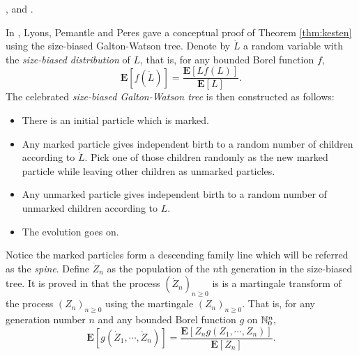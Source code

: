 \documentclass[12pt]{amsart}
\theoremstyle{remark}
\numberwithin{equation}{section}
\newcommand{\defn}[1]{{\em #1}}
\newcommand{\expr}[1]{\left( #1 \right)}
\newcommand{\brac}[1]{\left[ #1 \right]}
\newcommand{\expct}{\mathbf E}
\begin{document}
\cite{lyons1995conceptual}, \cite{geiger1999elementary} and \cite{geiger2000new}.
\par
In \cite{lyons1995conceptual}, Lyons, Pemantle and Peres
gave
a conceptual proof of Theorem \ref{thm:kesten} using the size-biased Galton-Watson tree. Denote by $\dot L$ a random variable with 
the \defn{size-biased distribution} of $L$, 
that is, for any bounded Borel function $f$,
\begin{equation*}
		\expct\brac{f\expr{\dot L}}
	=
		\frac{\expct\brac{Lf(L)}}{\expct\brac{L}}.
\end{equation*}
	The celebrated \defn{size-biased Galton-Watson tree} is then constructed as follows:
\begin{itemize}
\item
	There is an initial particle which is marked.
\item
	Any marked particle gives independent birth to a random number of children according to $\dot L$. Pick one of those children randomly as 
the new marked particle while leaving other children as unmarked particles.
\item
	Any unmarked particle gives independent birth to a random number of unmarked children according to $L$.
\item
The evolution goes on.
\end{itemize}
\par
Notice the marked particles form a descending family line
which will be referred as the \defn{spine}. 
Define $\dot Z_n$ as the population of the $n$th generation in the size-biased tree. %
It is proved in \cite{lyons1995conceptual} that the process
$(\dot Z_n)_{n\ge 0}$ is 
is a martingale transform of the process $(Z_n)_{n\ge 0}$ using the martingale $(Z_n)_{n\ge 0}.$
That is, for any generation number $n$ and any bounded Borel function $g$ on $\mathbb N_0^{n},$
\begin{equation}
\label{eq:htransformation}
          \expct\brac{g\expr{\dot Z_1,\cdots,\dot Z_n}}
	=
        \frac{\expct\brac{Z_n g\expr{Z_1,\cdots, Z_n}}}{\expct\brac{Z_n}}.
\end{equation}
\end{document}
